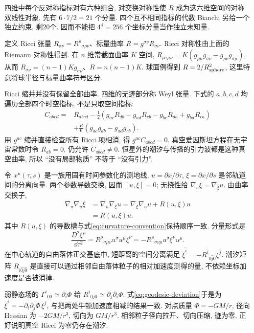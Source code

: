 四维中每个反对称指标对有六种组合, 对交换对称性使 $R$ 成为这六维空间的对称双线性对象, 先有 $6\cdot7/2=21$ 个分量. 四个互不相同指标的代数 Bianchi 另给一个独立约束, 剩20个. 因而不能把 $4^4=256$ 个坐标分量当作独立未知量.

定义 Ricci 张量 $R_{\sigma\nu}=R^\rho{}_{\sigma\rho\nu}$、标量曲率 $R=g^{\sigma\nu}R_{\sigma\nu}$. Ricci 对称性由上面的 Riemann 对称性得到. 在 $n$ 维常截面曲率 $K$ 空间,
$R_{\rho\sigma\mu\nu}=K(g_{\rho\mu}g_{\sigma\nu}-g_{\rho\nu}g_{\sigma\mu})$, 从而 $R_{\sigma\nu}=(n-1)Kg_{\sigma\nu}$、$R=n(n-1)K$. 球面例得到 $R=2/R_{\rm sphere}^2$, 这里特意将球半径与标量曲率符号区分.

Ricci 缩并并没有保留全部曲率. 四维的无迹部分称 Weyl 张量. 下式的 $a,b,c,d$ 均遍历全部四个时空指标, 不是只取空间指标:
\begin{equation}\label{eq:weyl}
\begin{split}
C_{abcd}={}&R_{abcd}
-\frac12(g_{ac}R_{db}-g_{ad}R_{cb}-g_{bc}R_{da}+g_{bd}R_{ca})\\
&+\frac{R}{6}(g_{ac}g_{db}-g_{ad}g_{cb}).
\end{split}
\end{equation}
用 $g^{ac}$ 缩并直接检查所有 Ricci 项相消, 得 $g^{ac}C_{abcd}=0$. 真空爱因斯坦方程在无宇宙常数时令 $R_{ab}=0$, 仍允许 $C_{abcd}\ne0$. 恒星外的潮汐与传播的引力波都是这种真空曲率, 所以 ``没有局部物质'' 不等于 ``没有引力''.

令 $x^\mu(\tau,s)$ 是一族用固有时间参数化的测地线, $u=\partial x/\partial\tau$, $\xi=\partial x/\partial s$ 是邻轨道间的分离向量. 两个参数导数交换, 因而 $[u,\xi]=0$; 无挠性给 $\nabla_u\xi=\nabla_\xi u$. 由曲率交换子,
\begin{align*}
\nabla_u\nabla_u\xi
&=\nabla_u\nabla_\xi u
=\nabla_\xi\nabla_u u+R(u,\xi)u\\
&=R(u,\xi)u.
\end{align*}
其中 $R(u,\xi)$ 的导数槽与式\eqref{eq:curvature-convention}保持顺序一致. 分量形式是
\begin{equation}\label{eq:geodesic-deviation}
\frac{D^2\xi^\rho}{\dd\tau^2}
=R^\rho{}_{\sigma\mu\nu}u^\sigma u^\mu\xi^\nu
=-R^\rho{}_{\sigma\nu\mu}u^\sigma\xi^\nu u^\mu.
\end{equation}
在中心轨道的自由落体正交基底中, 短距离的空间分离满足 $\ddot\xi^{\hat i}=-R^{\hat i}{}_{\hat0\hat j\hat0}\xi^{\hat j}$. 潮汐矩阵 $R_{\hat i\hat0\hat j\hat0}$ 是直接可以通过相邻自由落体粒子的相对加速度测得的量, 不依赖坐标加速度是否被消掉.

弱静态场的 $\Gamma^i{}_{00}\simeq\partial_i\Phi$ 给 $R^i{}_{0j0}\simeq\partial_j\partial_i\Phi$. 式\eqref{eq:geodesic-deviation}于是为 $\ddot\xi^i=-\partial_i\partial_j\Phi\,\xi^j$, 与把两处牛顿加速度相减的结果一致. 对点质量 $\Phi=-GM/r$, 径向 Hessian 为 $-2GM/r^3$, 切向为 $GM/r^3$. 相邻粒子径向拉开、切向压缩, 迹为零, 正好说明真空 Ricci 为零仍存在潮汐.

